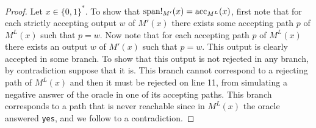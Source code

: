 \begin{proof}
	 Let $x\in\{0,1\}^*$. To show that $\text{span}!_{M'}(x) = \text{acc}_{M^L}(x)$, first note that for each strictly accepting output $w$ of $M'(x)$ there exists some accepting path $p$ of $M^L(x)$ such that $p = w$. Now note that for each accepting path $p$ of $M^L(x)$ there exists an output $w$ of $M'(x)$ such that $p = w$. This output is clearly accepted in some branch. To show that this output is not rejected in any branch, by contradiction suppose that it is. This branch cannot correspond to a rejecting path of $M^L(x)$ and then it must be rejected on line 11, from simulating a negative answer of the oracle in one of its accepting paths. This branch corresponds to a path that is never reachable since in $M^L(x)$ the oracle answered {\tt yes}, and we follow to a contradiction. 
\end{proof}